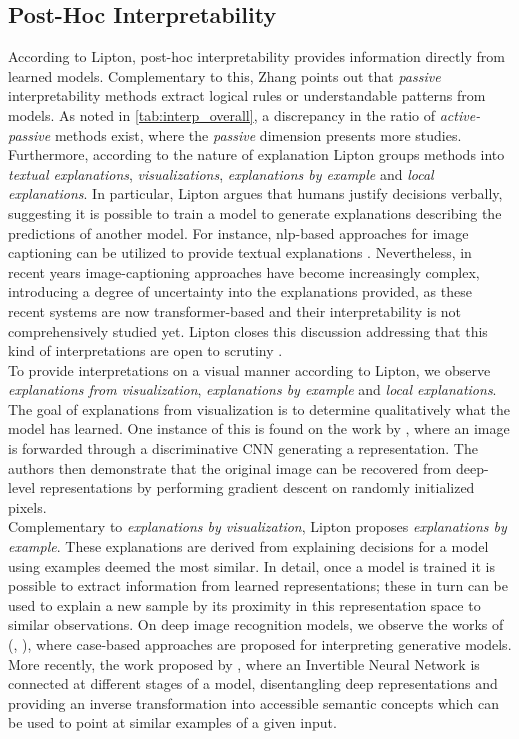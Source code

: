 \subsection{Post-Hoc Interpretability}
\label{rel:sub_post}
According to Lipton, post-hoc interpretability provides information directly from learned models. 
Complementary to this, Zhang points out that \emph{passive} interpretability methods extract 
logical rules or understandable patterns from models. As noted in \autoref{tab:interp_overall}, a 
discrepancy in the ratio of \emph{active-passive} methods exist, where the \emph{passive} 
dimension presents more studies. Furthermore, according to the nature of 
explanation Lipton groups methods into \emph{textual explanations}, \emph{visualizations}, 
\emph{explanations by example} and \emph{local explanations}. In particular, Lipton argues that 
humans justify decisions verbally, suggesting it is possible to train a model to generate 
explanations describing the predictions of another model. For instance, \gls{nlp}-based approaches 
for image captioning can be utilized to provide textual explanations \autocite{mcauley2013hidden}. 
Nevertheless, in recent years image-captioning approaches have become increasingly complex,
introducing a degree of uncertainty into the explanations provided, as these recent systems 
are now transformer-based and their interpretability is not comprehensively studied yet. Lipton 
closes this discussion addressing that this kind of interpretations are open to scrutiny 
\autocite{chang2009reading}.\\

\noindent To provide interpretations on a visual manner according to Lipton, we observe 
\emph{explanations from visualization}, \emph{explanations by example} and \emph{local explanations}. 
The goal of explanations from visualization is to determine qualitatively what the model has 
learned. One instance of this is found on the work by \cite{mahendran2015understanding}, where an 
image is forwarded through a discriminative CNN generating a representation. The authors then 
demonstrate that the original image can be recovered from deep-level representations by performing 
gradient descent on randomly initialized pixels.\\

\noindent Complementary to \emph{explanations by visualization}, Lipton proposes \emph{explanations 
by example}. These explanations are derived from explaining decisions for a model using examples 
deemed the most similar. In detail, once a model is trained it is possible to extract information 
from learned representations; these in turn can be used to explain a new sample by its proximity 
in this representation space to similar observations. On deep image recognition models, we observe 
the works of (\cite{kim2014bayesian}, \cite{doshi2015graph}), where case-based approaches are 
proposed for interpreting generative models. More recently, the work proposed by 
\cite{rombach2020making}, where an Invertible Neural Network is connected at different stages of a 
model, disentangling deep representations and providing an inverse transformation into accessible 
semantic concepts which can be used to point at similar examples of a given input.\\

